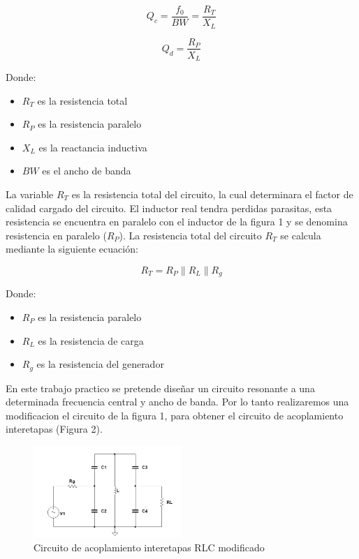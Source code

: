 \begin{equation}
    Q_c = \frac{f_0}{BW} = \frac{R_T}{X_L}
\end{equation}

\begin{equation}
    Q_d = \frac{R_P}{X_L}
\end{equation}

Donde: 

\begin{itemize}
    \item $R_T$ es la resistencia total
    \item $R_P$ es la resistencia paralelo
    \item $X_L$ es la reactancia inductiva
    \item $BW$ es el ancho de banda
\end{itemize}


La variable $R_T$ es la resistencia total del circuito, la cual determinara el factor de calidad cargado del circuito. 
El inductor real tendra perdidas parasitas, esta resistencia se encuentra en paralelo con el inductor
de la figura 1 y se denomina resistencia en paralelo ($R_P$). La resistencia total del circuito $R_T$ se calcula mediante la siguiente ecuación:

\begin{equation}
    R_T = R_P \parallel R_L \parallel R_g
\end{equation}

Donde:
\begin{itemize}
    \item $R_P$ es la resistencia paralelo
    \item $R_L$ es la resistencia de carga
    \item $R_g$ es la resistencia del generador
\end{itemize}

En este trabajo practico se pretende diseñar un circuito resonante a una determinada frecuencia central y ancho de banda. Por lo tanto realizaremos una 
modificacion el circuito de la figura 1, para obtener el circuito de acoplamiento interetapas (Figura 2). 

\begin{figure}[h]
    \centering
    \includegraphics[width=0.5\textwidth]{Imagenes/circuito_acoplamiento2.png}
    \caption{Circuito de acoplamiento interetapas RLC modificado}
\end{figure}

